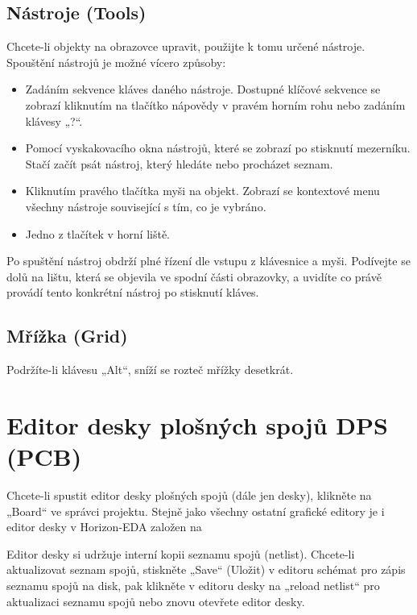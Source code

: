 \documentclass[letterpaper,10pt,czech]{sphinxmanual}
\begin{document}
\section{Nástroje (Tools)}
\label{\detokenize{imp:nastroje-tools}}
Chcete-li objekty na obrazovce upravit, použijte k tomu určené nástroje. Spouštění nástrojů je možné vícero způsoby:
\begin{itemize}
\item {} 
Zadáním sekvence kláves daného nástroje. Dostupné klíčové sekvence se zobrazí kliknutím na tlačítko nápovědy v pravém horním rohu nebo zadáním klávesy „?“.

\item {} 
Pomocí vyskakovacího okna nástrojů, které se zobrazí po stisknutí mezerníku. Stačí začít psát nástroj, který hledáte nebo procházet seznam.

\item {} 
Kliknutím pravého tlačítka myši na objekt. Zobrazí se kontextové menu všechny nástroje související s tím, co je vybráno.

\item {} 
Jedno z tlačítek v horní liště.

\end{itemize}

Po spuštění nástroj obdrží plné řízení dle vstupu z klávesnice a myši.
Podívejte se dolů na lištu, která se objevila ve spodní části obrazovky, a uvidíte co právě provádí tento konkrétní nástroj po stisknutí kláves.


\section{Mřížka (Grid)}
\label{\detokenize{imp:mrizka-grid}}
Podržíte-li klávesu „Alt“, sníží se rozteč mřížky desetkrát.


\chapter{Editor desky plošných spojů DPS (PCB)}
\label{\detokenize{imp-board:editor-desky-plosnych-spoju-dps-pcb}}\label{\detokenize{imp-board::doc}}
Chcete-li spustit editor desky plošných spojů (dále jen desky), klikněte na „Board“ ve správci projektu. Stejně jako všechny ostatní grafické editory je i editor desky v Horizon-EDA založen na {\hyperref[\detokenize{imp::doc}]{}}

Editor desky si udržuje interní kopii seznamu spojů (netlist). Chcete-li aktualizovat
seznam spojů, stiskněte „Save“ (Uložit) v editoru schémat pro zápis seznamu spojů na
disk, pak klikněte v editoru desky na „reload netlist“ pro aktualizaci seznamu spojů nebo znovu otevřete editor desky.
\end{document}
